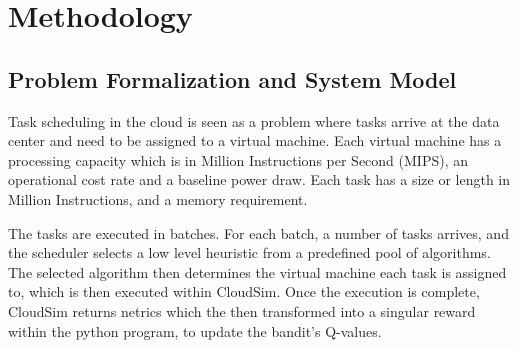 
\section{Methodology}
\label{sec:Methodology}


\subsection{Problem Formalization and System Model}

Task scheduling in the cloud is seen as a problem where tasks arrive at the data center and need to be assigned to a virtual machine. Each virtual machine has a processing capacity which is in Million Instructions per Second (MIPS), an operational cost rate and a baseline power draw. Each task has a size or length in Million Instructions, and a memory requirement.

The tasks are executed in batches. For each batch, a number of tasks arrives, and the scheduler selects a low level heuristic from a predefined pool of algorithms. The selected algorithm then determines the virtual machine each task is assigned to, which is then executed within CloudSim. Once the execution is complete, CloudSim returns netrics which the then transformed into a singular reward within the python program, to update the bandit's Q-values.


